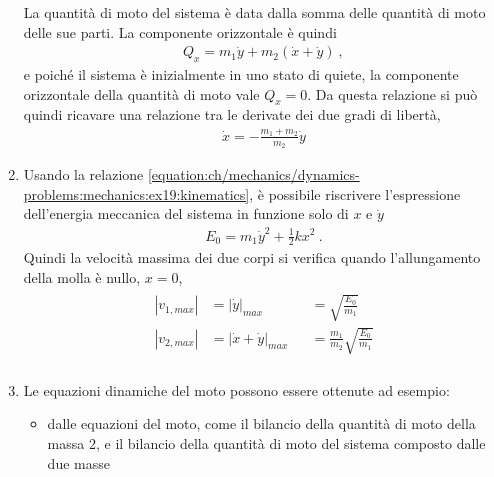 \documentclass[letterpaper,10pt,italian]{jupyterBook}
\begin{document}
\begin{enumerate}
\sphinxAtStartPar
La quantità di moto del sistema è data dalla somma delle quantità di moto delle sue parti. La componente orizzontale è quindi
\begin{equation*}
\begin{split}Q_x = m_1 \dot{y} + m_2 \left( \dot{x} + \dot{y} \right) \ ,\end{split}
\end{equation*}
\sphinxAtStartPar
e poiché il sistema è inizialmente in uno stato di quiete, la componente orizzontale della quantità di moto vale \(Q_x = 0\). Da questa relazione si può quindi ricavare una relazione tra le derivate dei due gradi di libertà,
\begin{equation}\label{equation:ch/mechanics/dynamics-problems:mechanics:ex19:kinematics}
\begin{split}\dot{x} = - \frac{m_1 + m_2}{m_2} \dot{y}\end{split}
\end{equation}
\item {} 
\sphinxAtStartPar
Usando la relazione \eqref{equation:ch/mechanics/dynamics-problems:mechanics:ex19:kinematics}, è possibile riscrivere l’espressione dell’energia meccanica del sistema in funzione solo di \(x\) e \(\dot{y}\)
\begin{equation*}
\begin{split}E_0 = m_1 \dot{y}^2 + \frac{1}{2} k x^2 \ .\end{split}
\end{equation*}
\sphinxAtStartPar
Quindi la velocità massima dei due corpi si verifica quando l’allungamento della molla è nullo, \(x = 0\),
\begin{equation*}
\begin{split}\begin{aligned}
       |v_{1,max}| & = |\dot{y}|_{max}         && = \sqrt{\frac{E_0}{m_1}} \\
       |v_{2,max}| & = |\dot{x}+\dot{y}|_{max} && = \frac{m_1}{m_2}\sqrt{\frac{E_0}{m_1}} \\
    \end{aligned}\end{split}
\end{equation*}
\item {} 
\sphinxAtStartPar
Le equazioni dinamiche del moto possono essere ottenute ad esempio:
\begin{itemize}
\item {} 
\sphinxAtStartPar
dalle equazioni del moto, come il bilancio della quantità di moto della massa 2, e il bilancio della quantità di moto del sistema composto dalle due masse

\end{itemize}
\end{enumerate}
\end{document}
